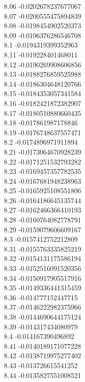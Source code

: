 {8.06	-0.0202678237677067\\
8.07	-0.0200555475894839\\
8.08	-0.0198454902520373\\
8.09	-0.0196376286546708\\
8.1	-0.0194319399352963\\
8.11	-0.019228401468011\\
8.12	-0.0190269908606856\\
8.13	-0.0188276859525988\\
8.14	-0.0186304648120766\\
8.15	-0.0184353057341584\\
8.16	-0.0182421872382907\\
8.17	-0.0180510880660435\\
8.18	-0.017861987178846\\
8.19	-0.0176748637557471\\
8.2	-0.0174896971911894\\
8.21	-0.0173064670928239\\
8.22	-0.0171251532793282\\
8.23	-0.0169457357782535\\
8.24	-0.0167681948238963\\
8.25	-0.0165925108551806\\
8.26	-0.0164186645135744\\
8.27	-0.0162466366410193\\
8.28	-0.0160764082778791\\
8.29	-0.0159079606609167\\
8.3	-0.0157412752212809\\
8.31	-0.0155763335825219\\
8.32	-0.0154131175586194\\
8.33	-0.0152516091520356\\
8.34	-0.0150917905517916\\
8.35	-0.0149336441315459\\
8.36	-0.014777152447715\\
8.37	-0.0146222982375966\\
8.38	-0.0144690644175124\\
8.39	-0.014317434080979\\
8.4	-0.014167390496892\\
8.41	-0.0140189171077228\\
8.42	-0.0138719975277402\\
8.43	-0.013726615541252\\
8.44	-0.0135827551008521\\
}
